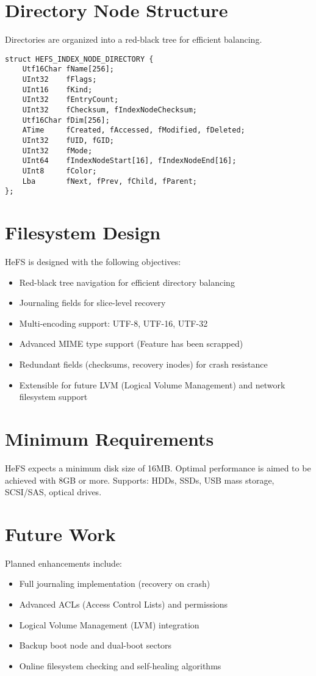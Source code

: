 \documentclass{article}
\begin{document}
\section{Directory Node Structure}
Directories are organized into a red-black tree for efficient balancing.

\begin{lstlisting}[style=cstyle, caption={HEFS\_INDEX\_NODE\_DIRECTORY structure}]
struct HEFS_INDEX_NODE_DIRECTORY {
    Utf16Char fName[256];
    UInt32    fFlags;
    UInt16    fKind;
    UInt32    fEntryCount;
    UInt32    fChecksum, fIndexNodeChecksum;
    Utf16Char fDim[256];
    ATime     fCreated, fAccessed, fModified, fDeleted;
    UInt32    fUID, fGID;
    UInt32    fMode;
    UInt64    fIndexNodeStart[16], fIndexNodeEnd[16];
    UInt8     fColor;
    Lba       fNext, fPrev, fChild, fParent;
};
\end{lstlisting}

\section{Filesystem Design}

HeFS is designed with the following objectives:
\begin{itemize}
    \item Red-black tree navigation for efficient directory balancing
    \item Journaling fields for slice-level recovery
    \item Multi-encoding support: UTF-8, UTF-16, UTF-32
    \item Advanced MIME type support (Feature has been scrapped)
    \item Redundant fields (checksums, recovery inodes) for crash resistance
    \item Extensible for future LVM (Logical Volume Management) and network filesystem support
\end{itemize}

\section{Minimum Requirements}

HeFS expects a minimum disk size of 16MB. Optimal performance is aimed to be achieved with 8GB or more.
Supports: HDDs, SSDs, USB mass storage, SCSI/SAS, optical drives.

\section{Future Work}
Planned enhancements include:
\begin{itemize}
    \item Full journaling implementation (recovery on crash)
    \item Advanced ACLs (Access Control Lists) and permissions
    \item Logical Volume Management (LVM) integration
    \item Backup boot node and dual-boot sectors
    \item Online filesystem checking and self-healing algorithms
\end{itemize}
\end{document}
